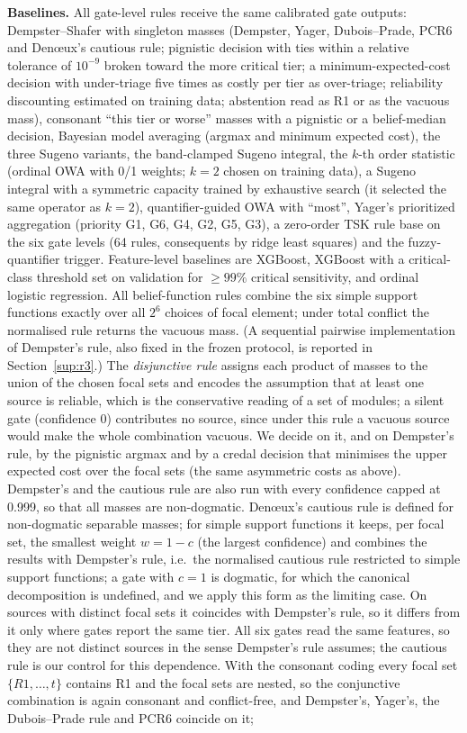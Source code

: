 \documentclass[11pt,a4paper]{article}%
\begin{document}
\textbf{Baselines.} All gate-level rules receive the same calibrated gate outputs: Dempster--Shafer with singleton masses (Dempster, Yager, Dubois--Prade, PCR6 and Den\oe{}ux's cautious rule; pignistic decision with ties within a relative tolerance of $10^{-9}$ broken toward the more critical tier; a minimum-expected-cost decision with under-triage five times as costly per tier as over-triage; reliability discounting estimated on training data; abstention read as R1 or as the vacuous mass), consonant ``this tier or worse'' masses with a pignistic or a belief-median decision, Bayesian model averaging (argmax and minimum expected cost), the three Sugeno variants, the band-clamped Sugeno integral, the $k$-th order statistic (ordinal OWA with 0/1 weights; $k=2$ chosen on training data), a Sugeno integral with a symmetric capacity trained by exhaustive search (it selected the same operator as $k=2$), quantifier-guided OWA with ``most'', Yager's prioritized aggregation (priority G1, G6, G4, G2, G5, G3), a zero-order TSK rule base on the six gate levels (64 rules, consequents by ridge least squares) and the fuzzy-quantifier trigger. Feature-level baselines are XGBoost, XGBoost with a critical-class threshold set on validation for $\ge99\%$ critical sensitivity, and ordinal logistic regression. All belief-function rules combine the six simple support functions exactly over all $2^6$ choices of focal element; under total conflict the normalised rule returns the vacuous mass. (A sequential pairwise implementation of Dempster's rule, also fixed in the frozen protocol, is reported in Section~\ref{sup:r3}.) The \emph{disjunctive rule} \cite{dubois1988representation,smets1994transferable} assigns each product of masses to the union of the chosen focal sets and encodes the assumption that at least one source is reliable, which is the conservative reading of a set of modules; a silent gate (confidence 0) contributes no source, since under this rule a vacuous source would make the whole combination vacuous. We decide on it, and on Dempster's rule, by the pignistic argmax and by a credal decision that minimises the upper expected cost over the focal sets (the same asymmetric costs as above). Dempster's and the cautious rule are also run with every confidence capped at 0.999, so that all masses are non-dogmatic. Den\oe{}ux's cautious rule is defined for non-dogmatic separable masses; for simple support functions it keeps, per focal set, the smallest weight $w=1-c$ (the largest confidence) and combines the results with Dempster's rule, i.e.\ the normalised cautious rule restricted to simple support functions; a gate with $c=1$ is dogmatic, for which the canonical decomposition is undefined, and we apply this form as the limiting case. On sources with distinct focal sets it coincides with Dempster's rule, so it differs from it only where gates report the same tier. All six gates read the same features, so they are not distinct sources in the sense Dempster's rule assumes; the cautious rule \cite{denoeux2008conjunctive} is our control for this dependence. With the consonant coding every focal set $\{R1,\ldots,t\}$ contains R1 and the focal sets are nested, so the conjunctive combination is again consonant and conflict-free, and Dempster's, Yager's, the Dubois--Prade rule and PCR6 coincide on it; 
\end{document}
